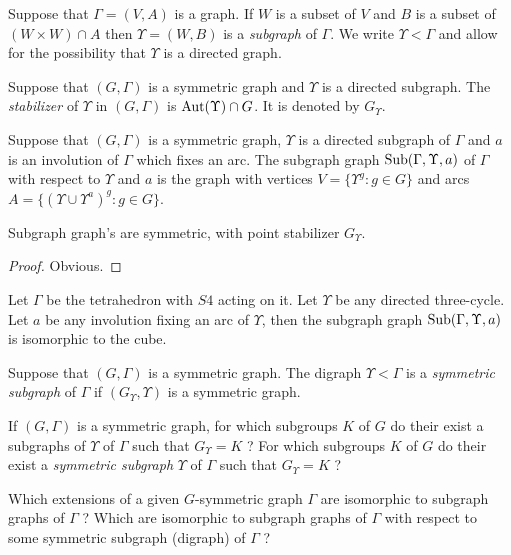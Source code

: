 \begin{definition} [Subgraph]
Suppose that $\Gamma = (V,A)$ is a graph.
If $W$ is a subset of $V$
and $B$ is a subset of $(W \times W) \cap A$
then $\Upsilon = (W,B)$ is a {\it subgraph} of $\Gamma$.
We write $\Upsilon < \Gamma$ and allow for the possibility
that $\Upsilon$ is a directed graph.
\end{definition}


\begin{definition} 
Suppose that $(G, \Gamma)$ is a symmetric graph and
$\Upsilon$ is a directed subgraph. The {\it stabilizer}
of $\Upsilon$ in $(G, \Gamma)$ is $\operatorname{Aut}(\Upsilon) \cap G$.
It is denoted by $G_{\Upsilon}$.
\end{definition}


\begin{definition} 
Suppose that $(G, \Gamma)$ is a symmetric graph,
$\Upsilon$ is a directed subgraph of $\Gamma$ 
and $a$ is an involution of $\Gamma$ which fixes an arc.
The subgraph graph  $\operatorname{Sub}(\Gamma, \Upsilon, a)$
of $\Gamma$ with respect to $\Upsilon$ and $a$
is the graph with vertices  $V = \{ \Upsilon^g : g \in G \}$
and arcs $A = \{ (\Upsilon \cup \Upsilon^a)^g : g \in G \}$.
\end{definition}

\begin{proposition}
Subgraph graph's are symmetric, with point stabilizer $G_{\Upsilon}$.
\begin{proof}
Obvious.
\end{proof}
\end{proposition}

\begin{example} 
Let $\Gamma$ be the tetrahedron with $S4$ acting on it.
Let $\Upsilon$ be any directed three-cycle.
Let $a$ be any involution fixing an arc of $\Upsilon$,
then the subgraph graph $\operatorname{Sub}(\Gamma,\Upsilon,a)$
is isomorphic to the cube.
\end{example}


\begin{definition} 
Suppose that $(G,\Gamma)$ is a symmetric graph.
The digraph $\Upsilon < \Gamma$ is a {\it symmetric subgraph}
of $\Gamma$ if $(G_\Upsilon, \Upsilon)$ is a symmetric graph.
\end{definition}

\begin{question}
If $(G, \Gamma)$ is a symmetric graph, for which subgroups $K$ of $G$
do their exist a subgraphs of $\Upsilon$ of $\Gamma$ such that
$G_\Upsilon = K$ ?
For which subgroups $K$ of $G$
do their exist a {\it symmetric subgraph} $\Upsilon$ of $\Gamma$ such that
$G_\Upsilon = K$ ?
\end{question}

\begin{question}
Which extensions of a given $G$-symmetric graph $\Gamma$
are isomorphic to subgraph graphs of $\Gamma$ ?
Which are isomorphic to subgraph graphs of $\Gamma$
with respect to some symmetric subgraph (digraph) of $\Gamma$ ?
\end{question}



